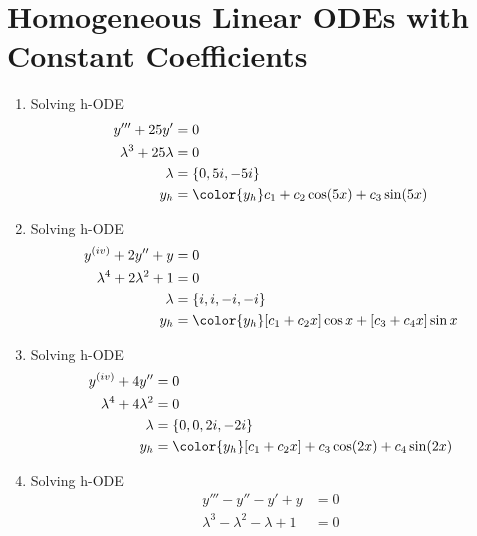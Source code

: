 \section{Homogeneous Linear ODEs with Constant Coefficients}
\begin{enumerate}
    \item Solving h-ODE
          \begin{align}
              y''' + 25y'             & = 0                                  \\
              \lambda^{3} + 25\lambda & = 0                                  \\
              \lambda                 & = \{0, 5i, -5i\}                     \\
              y_{h}                   & = {\color{y_h} c_{1} + c_{2}\cos(5x)
              + c_{3}\sin(5x)}
          \end{align}
    \item Solving h-ODE
          \begin{align}
              y^{(iv)} + 2y'' + y            & = 0                             \\
              \lambda^{4} + 2\lambda^{2} + 1 & = 0                             \\
              \lambda                        & = \{i, i, -i, -i\}              \\
              y_{h}                          & = {\color{y_h} [c_{1} + c_{2}x]
              \cos x + [c_{3} + c_{4}x] \sin x}
          \end{align}
    \item Solving h-ODE
          \begin{align}
              y^{(iv)} + 4y''            & = 0                               \\
              \lambda^{4} + 4\lambda^{2} & = 0                               \\
              \lambda                    & = \{0, 0, 2i, -2i\}               \\
              y_{h}                      & = {\color{y_h} [c_{1} + c_{2}x] +
              c_{3}\cos(2x) + c_{4} \sin(2x)}
          \end{align}
    \item Solving h-ODE
          \begin{align}
              y''' - y'' - y' + y                     & = 0                   \\
              \lambda^{3} - \lambda^{2} - \lambda + 1 & = 0                   \\

\end{align}
\end{enumerate}
